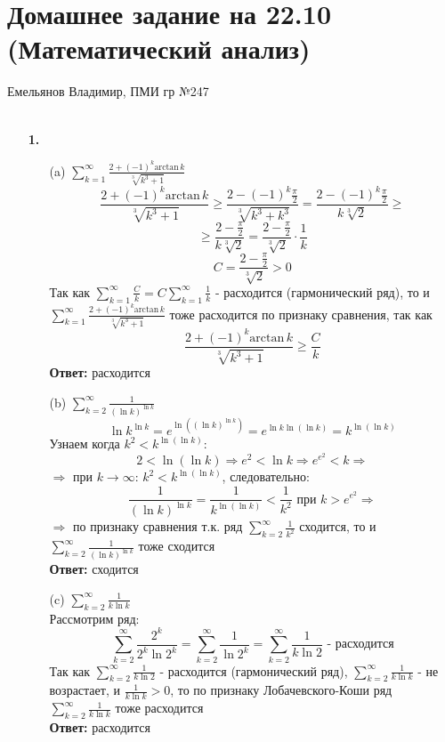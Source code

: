 \documentclass[a4paper]{article}
\renewcommand{\f}[2]{\frac{#1}{#2}}
\newcommand{\s}[2]{\sum\limits_{#1}^{#2}}
\renewcommand{\r}{\Rightarrow}
\renewcommand{\geq}{\geqslant}
\begin{document}
\section*{Домашнее задание на 22.10 (Математический анализ)}
{\large Емельянов Владимир, ПМИ гр №247}\\\\
\begin{enumerate}
    \item[\textbf{1.}]
    \begin{enumerate}
        \item[(a)]
        $\s{k=1}{\infty}\frac{2+(-1)^k\mathrm{arctan}\,k}{\sqrt[3]{k^3+1}}$
        $$\frac{2+(-1)^k\mathrm{arctan}\,k}{\sqrt[3]{k^3+1}} \geq \frac{2-(-1)^k\frac{\pi}{2}}{\sqrt[3]{k^3+k^3}} = \frac{2-(-1)^k\frac{\pi}{2}}{k\sqrt[3]{2}} \geq $$
        $$\geq \f{2-\f{\pi}{2}}{k\sqrt[3]{2}} = \f{2-\f{\pi}{2}}{\sqrt[3]{2}}\cdot \f{1}{k} $$
        $$C = \f{2-\f{\pi}{2}}{\sqrt[3]{2}} > 0$$
        Так как $\s{k=1}{\infty} \f{C}{k} = C\s{k=1}{\infty} \f{1}{k}$ - расходится (гармонический ряд), то и $\s{k=1}{\infty}\frac{2+(-1)^k\mathrm{arctan}\,k}{\sqrt[3]{k^3+1}}$ тоже расходится по признаку сравнения, так как $$\frac{2+(-1)^k\mathrm{arctan}\,k}{\sqrt[3]{k^3+1}} \geq \f{C}{k}$$
        \textbf{Ответ: } расходится \\

        \item[(b)]
        $\s{k=2}{\infty}\f{1}{(\ln{k})^{\ln{k}}}$
        $$\ln{k}^{\ln{k}} = e^{\ln{((\ln{k})^{\ln{k}})}} = e^{\ln{k}\ln{(\ln{k})}}  = k^{\ln{(\ln{k})}}$$
        Узнаем когда $k^2 <k^{\ln{(\ln{k})}} $:
        $$2 < \ln{(\ln{k})} \r e^2< \ln{k} \r e^{e^2} < k \r $$
        $\r $ при $k \to \infty$: $k^2 < k^{\ln{(\ln{k})}} $, следовательно:
        $$\f{1}{(\ln{k})^{\ln{k}}} = \f{1}{k^{\ln{(\ln{k})}}} < \f{1}{k^2} \text{ при } k > e^{e^2} \r$$
        $\r$ по признаку сравнения т.к. ряд $\s{k=2}{\infty}\f{1}{k^2}$ сходится, то и $\s{k=2}{\infty}\f{1}{(\ln{k})^{\ln{k}}}$ тоже сходится\\
        \textbf{Ответ:} сходится\\
        
        \item[(c)]
        $\s{k=2}{\infty} \f{1}{k\ln{k}}$\\
        Рассмотрим ряд: 
        $$\s{k=2}{\infty} \f{2^k}{2^k\ln{2^k}} = \s{k=2}{\infty} \f{1}{\ln{2^k}} = \s{k=2}{\infty} \f{1}{k\ln{2}} \text{ - расходится}$$
        Так как $\s{k=2}{\infty} \f{1}{k\ln{2}} \text{ - расходится}$ (гармонический ряд), $\s{k=2}{\infty} \f{1}{k\ln{k}}$ - не возрастает, и $\f{1}{k\ln{k}} > 0$, то по признаку Лобачевского-Коши ряд $\s{k=2}{\infty} \f{1}{k\ln{k}}$ тоже расходится\\
        \textbf{Ответ: } расходится\\


\end{enumerate}
\end{enumerate}
\end{document}
